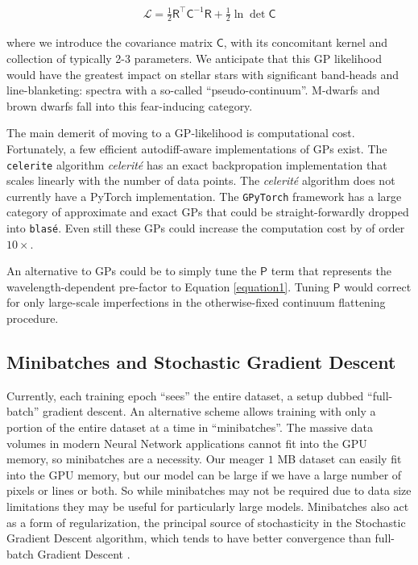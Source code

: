 \documentclass[modern]{aastex631}
\begin{document}
\begin{eqnarray}
    \mathcal{L} =  \frac{1}{2}\mathsf{R^\intercal} \mathsf{C}^{-1} \mathsf{R} +\frac{1}{2}\ln{\det{\mathsf{C}}} \label{GPLikelihood}
\end{eqnarray}

where we introduce the covariance matrix $\mathsf{C}$, with its concomitant kernel and collection of typically 2-3 parameters.  We anticipate that this GP likelihood would have the greatest impact on stellar stars with significant band-heads and line-blanketing: spectra with a so-called ``pseudo-continuum''.  M-dwarfs and brown dwarfs fall into this fear-inducing category.

The main demerit of moving to a GP-likelihood is computational cost.  Fortunately, a few efficient autodiff-aware implementations of GPs exist. The \texttt{celerite} algorithm \emph{celerit\'e} \citep{2017AJ....154..220F} has an exact backpropation implementation \citep{2018RNAAS...2...31F} that scales linearly with the number of data points.  The \emph{celerit\'e} algorithm does not currently have a PyTorch implementation.  The \texttt{GPyTorch} framework \citep{2018arXiv180911165G} has a large category of approximate and exact GPs that could be straight-forwardly dropped into \texttt{blas\'e}.  Even still these GPs could increase the computation cost by of order $10\times$.

An alternative to GPs could be to simply tune the $\mathsf{P}$ term that represents the wavelength-dependent pre-factor to Equation \ref{equation1}.  Tuning $\mathsf{P}$ would correct for only large-scale imperfections in the otherwise-fixed continuum flattening procedure.


\subsection{Minibatches and Stochastic Gradient Descent}

Currently, each training epoch ``sees'' the entire dataset, a setup dubbed ``full-batch'' gradient descent.  An alternative scheme allows training with only a portion of the entire dataset at a time in ``minibatches''.  The massive data volumes in modern Neural Network applications cannot fit into the GPU memory, so minibatches are a necessity.  Our meager $1$ MB dataset can easily fit into the GPU memory, but our model can be large if we have a large number of pixels or lines or both.  So while minibatches may not be required due to data size limitations they may be useful for particularly large models.  Minibatches also act as a form of regularization, the principal source of stochasticity in the Stochastic Gradient Descent algorithm, which tends to have better convergence than full-batch Gradient Descent \citep{2016arXiv160904747R}.
\end{document}

